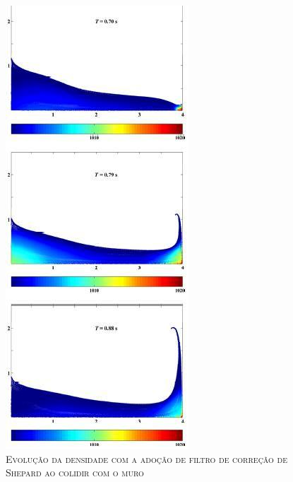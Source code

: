 \begin{figure}[H]
\centering
\includegraphics[scale=1]{figuras/cfiltroS.jpg}
\caption{\textsc{Evolução da densidade com a adoção de filtro de correção de Shepard ao colidir com o muro}}
\vspace{-0.1cm}
\label{fig:cfiltroS}
\end{figure}

